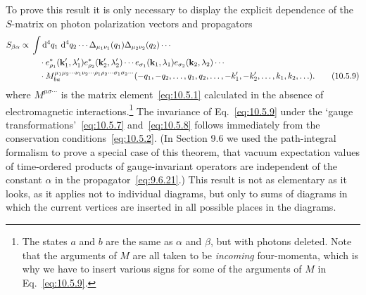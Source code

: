 To prove this result it is only necessary to display the explicit dependence
of the $S$-matrix on photon polarization vectors and propagators
\begin{align}
  S_{\beta\alpha}\propto{}&
  \int \mathop{}\!\mathrm{d}^4q_1\,\mathop{}\!\mathrm{d}^4q_2\cdots
  \Delta_{\mu_1\nu_1}(q_1)\Delta_{\mu_2\nu_2}(q_2)\cdots \notag\\
  &\quad\cdot
  e^*_{\rho_1}(\mathbf{k}'_1,\lambda'_1)
  e^*_{\rho_2}(\mathbf{k}'_2,\lambda'_2)\cdots
  e_{\sigma_1}(\mathbf{k}_1,\lambda_1)
  e_{\sigma_2}(\mathbf{k}_2,\lambda_2)\cdots \notag\\
  &\quad\cdot
  M_{ba}^{\mu_1\mu_2\cdots\nu_1\nu_2\cdots
  \rho_1\rho_2\cdots\sigma_1\sigma_2\cdots}
  (-q_1,-q_2,\ldots,q_1,q_2,\ldots,
  -k'_1,-k'_2,\ldots,k_1,k_2,\ldots).
  \tag{10.5.9}\label{eq:10.5.9}
\end{align}
where $M^{\mu\sigma\cdots}$ is the matrix element~\eqref{eq:10.5.1}
calculated in the absence of electromagnetic interactions.\footnote{The
states $a$ and $b$ are the same as $\alpha$ and $\beta$, but with photons
deleted. Note that the arguments of $M$ are all taken to be \emph{incoming}
four-momenta, which is why we have to insert various signs for some of the
arguments of $M$ in Eq.~\eqref{eq:10.5.9}.} The invariance of
Eq.~\eqref{eq:10.5.9} under the `gauge transformations'~\eqref{eq:10.5.7}
and~\eqref{eq:10.5.8} follows immediately from the conservation
conditions~\eqref{eq:10.5.2}. (In Section 9.6 we used the path-integral
formalism to prove a special case of this theorem, that vacuum expectation
values of time-ordered products of gauge-invariant operators are independent
of the constant $\alpha$ in the propagator~\eqref{eq:9.6.21}.) This result is
not as elementary as it looks, as it applies not to individual diagrams, but
only to sums of diagrams in which the current vertices are inserted in all
possible places in the diagrams.

